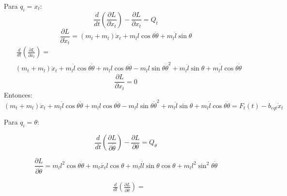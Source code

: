 \documentclass{article}
\begin{document}
            Para \(q_i = x_t\):
            \begin{equation}\label{eq:euler2}
                \frac{d}{dt}\left(\frac{\partial L}{\partial \dot{x}_t}\right)-\frac{\partial L}{\partial x_t}=Q_t
            \end{equation}
            \begin{equation}
                \frac{\partial L}{\partial \dot{x}_t}= (m_t+m_l)\dot{x}_t+m_ll\cos{\theta}\dot{\theta}+m_l\dot{l}\sin{\theta}
            \end{equation}
            \begin{equation}
                \begin{split}              
                    & \,\frac{d}{dt}\left(\frac{\partial L}{\partial \dot{x}_t}\right)= \\
                    &(m_t+m_l)\ddot{x}_t+m_l\dot{l}\cos{\theta}\dot{\theta}+m_ll\cos{\theta}\ddot{\theta}-m_ll\sin{\theta}\dot{\theta}^2+
                    m_l\ddot{l}\sin{\theta}+m_l\dot{l}\cos{\theta}\dot{\theta}
                \end{split}
            \end{equation}
            \begin{equation}
                \frac{\partial L}{\partial x_t}=0
            \end{equation}
            Entonces:
            \begin{equation}
                (m_t+m_l)\ddot{x}_t+m_l\dot{l}\cos{\theta}\dot{\theta}+m_ll\cos{\theta}\ddot{\theta}-m_ll\sin{\theta}\dot{\theta}^2+
                m_l\ddot{l}\sin{\theta}+m_l\dot{l}\cos{\theta}\dot{\theta}=F_t(t)-b_{eqt} \dot{x}_t
            \end{equation}

            Para \(q_i = \theta\):

            \begin{equation}\label{eq:euler3}
                \frac{d}{dt}\left(\frac{\partial L}{\partial \dot{\theta}}\right)-\frac{\partial L}{\partial \theta}=Q_{\theta}
            \end{equation}

            \begin{equation}
                \frac{\partial L}{\partial \dot{\theta}}=m_ll^2\cos{\theta}\dot{\theta}+m_l\dot{x_t}l\cos{\theta}+m_ll\dot{l}\sin{\theta}\cos{\theta}+m_ll^2\sin^2{\theta}\dot{\theta}
            \end{equation}


            \begin{equation}
                \begin{split}
                    & \,\frac{d}{dt}\left(\frac{\partial L}{\partial \dot{\theta}}\right)= \\
                    &
                \end{split}
            \end{equation}
\end{document}
